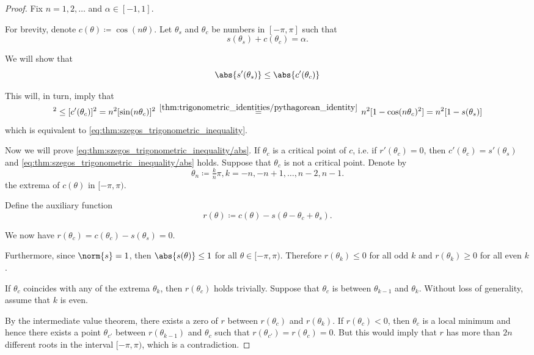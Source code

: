 \begin{proof}
  Fix \( n = 1, 2, \ldots \) and \( \alpha \in [-1, 1] \).

  For brevity, denote \( c(\theta) \coloneqq \cos(n \theta) \). Let \( \theta_s \) and \( \theta_c \) be numbers in \( [-\pi, \pi] \) such that
  \begin{equation*}
    s(\theta_s) + c(\theta_c) = \alpha.
  \end{equation*}

  We will show that
  \begin{equation}\label{eq:thm:szegos_trigonometric_inequality/abs}
    \abs{s'(\theta_s)} \leq \abs{c'(\theta_c)}
  \end{equation}

  This will, in turn, imply that
  \begin{equation*}
    [s'(\theta_s)]^2
    \leq
    [c'(\theta_c)]^2
    =
    n^2 [\sin(n \theta_c)]^2
    \reloset {\ref{thm:trigonometric_identities/pythagorean_identity}}
    =
    n^2 [1 - \cos(n \theta_c)^2]
    =
    n^2 [1 - s(\theta_s)]
  \end{equation*}
  which is equivalent to \eqref{eq:thm:szegos_trigonometric_inequality}.

  Now we will prove \eqref{eq:thm:szegos_trigonometric_inequality/abs}. If \( \theta_c \) is a critical point of \( c \), i.e. if \( r'(\theta_c) = 0 \), then \( c'(\theta_c) = s'(\theta_s) \) and \eqref{eq:thm:szegos_trigonometric_inequality/abs} holds. Suppose that \( \theta_c \) is not a critical point. Denote by
  \begin{equation*}
    \theta_n \coloneqq \tfrac k n \pi, k = -n, -n+1, \ldots, n-2, n-1.
  \end{equation*}
  the extrema of \( c(\theta) \) in \( [-\pi, \pi) \).

  Define the auxiliary function
  \begin{equation*}
    r(\theta) \coloneqq c(\theta) - s(\theta - \theta_c + \theta_s).
  \end{equation*}

  We now have \( r(\theta_c) = c(\theta_c) - s(\theta_s) = 0 \).

  Furthermore, since \( \norm{s} = 1 \), then \( \abs{s(\theta)} \leq 1 \) for all \( \theta \in [-\pi, \pi) \). Therefore \( r(\theta_k) \leq 0 \) for all odd \( k \) and \( r(\theta_k) \geq 0 \) for all even \( k \).

  If \( \theta_c \) coincides with any of the extrema \( \theta_k \), then \( r(\theta_c) \) holds trivially. Suppose that \( \theta_c \) is between \( \theta_{k-1} \) and \( \theta_k \). Without loss of generality, assume that \( k \) is even.

  By the intermediate value theorem, there exists a zero of \( r \) between \( r(\theta_c) \) and \( r(\theta_k) \). If \( r(\theta_c) < 0 \), then \( \theta_c \) is a local minimum and hence there exists a point \( \theta_{c'} \) between \( r(\theta_{k-1}) \) and \( \theta_c \) such that \( r(\theta_{c'}) = r(\theta_c) = 0 \). But this would imply that \( r \) has more than \( 2n \) different roots in the interval \( [-\pi, \pi) \), which is a contradiction.
\end{proof}

